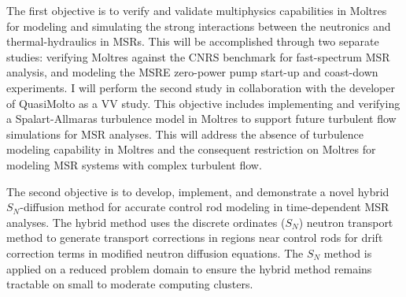    The first objective is to verify and validate multiphysics capabilities in Moltres for
    modeling and simulating
    the strong interactions between the neutronics and thermal-hydraulics in \glspl{MSR}. This
    will be accomplished through two separate studies: verifying Moltres against the CNRS
    benchmark \cite{tiberga_results_2020} for fast-spectrum \gls{MSR} analysis, and modeling the
    \gls{MSRE} zero-power pump start-up and coast-down experiments. I will perform the second study
    in collaboration with the developer of QuasiMolto \cite{reynolds_analysis_2023} as a \gls{VV}
    study.
%
    This objective includes implementing and verifying a Spalart-Allmaras turbulence model in
    Moltres to support future turbulent flow
    simulations for \gls{MSR} analyses. This will address the absence of turbulence modeling
    capability in Moltres and the consequent restriction on Moltres for modeling \gls{MSR} systems
    with complex turbulent flow.


    The second objective is to develop, implement, and demonstrate a novel hybrid $S_N$-diffusion
    method for accurate control rod modeling in
    time-dependent \gls{MSR} analyses. The hybrid method uses the discrete ordinates ($S_N$)
    neutron transport method to generate transport corrections in regions near control rods for
    drift correction terms in modified neutron diffusion equations. The $S_N$ method is applied on
    a reduced problem domain to ensure the hybrid method remains tractable on small to moderate
    computing clusters.

